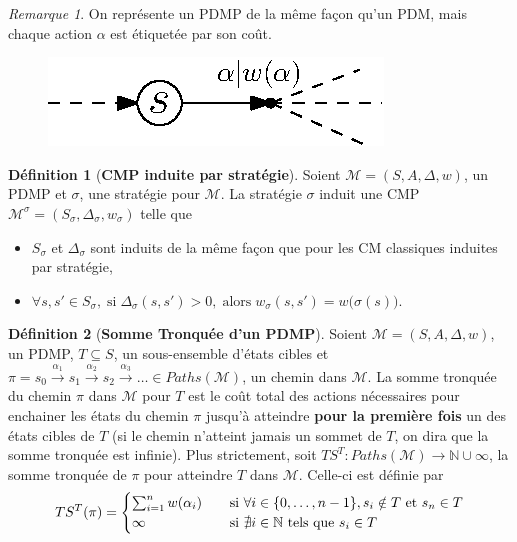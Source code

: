 \documentclass[12pt,a4paper]{report}
\theoremstyle{definition}%
\newtheorem{definition}{Définition}[chapter]
\theoremstyle{remark}
\newtheorem{remark}{Remarque}[chapter]
\let\labelitemi\labelitemii
\begin{document}
\begin{remark}
	On représente un PDMP de la même façon qu'un PDM, mais chaque action $\alpha$
	est étiquetée par son coût.
	\begin{figure}[H]
	\centering
		\includegraphics{figures/PDMP-example}
	\end{figure}
\end{remark}

\begin{definition}[\textbf{CMP induite par stratégie}]
	Soient $\mathcal{M} = (S, A, \Delta, w)$, un PDMP et $\sigma$, une
	stratégie pour $\mathcal{M}$. La stratégie $\sigma$ induit une CMP
	$\mathcal{M}^\sigma = (S_\sigma, \Delta_\sigma, w_\sigma)$ telle que
	\begin{itemize}
		\renewcommand{\labelitemi}{\tiny$\bullet$}
		\item $S_\sigma$ et $\Delta_\sigma$ sont induits de la même
			façon que pour les CM classiques induites par stratégie,
		\item
			$\forall s, s' \in S_{\sigma}, \; \text{si} \;
			\Delta_{\sigma}(s, s') > 0, \; \text{alors} \; w_{\sigma}(s, s') = w\big(\sigma(s)\big)$.
	\end{itemize}
\end{definition}


\begin{definition}[\textbf{Somme Tronquée d'un PDMP}]
	Soient $\mathcal{M} = (S, A, \Delta, w)$, un PDMP, $T \subseteq S$, un
	sous-ensemble d'états cibles et
	$\pi = s_0 \xrightarrow{\alpha_1} s_1 \xrightarrow{\alpha_2} s_2 \xrightarrow{\alpha_3} \dots \in Paths(\mathcal{M})$, un chemin dans
	$\mathcal{M}$. La somme tronquée du chemin $\pi$ dans $\mathcal{M}$ pour $T$
	est le coût total des actions nécessaires pour enchainer les états du chemin
	$\pi$ jusqu'à atteindre \textbf{pour la première fois} un des états cibles de
	$T$ (si le chemin n'atteint jamais un sommet de $T$, on dira que la somme
	tronquée est infinie). Plus strictement, soit $TS^T : Paths(\mathcal{M})
	\rightarrow \mathbb{N} \cup {\infty}$, la somme tronquée de $\pi$ pour atteindre $T$ dans
	$\mathcal{M}$. Celle-ci est définie par
	\[
		TS^T(\pi) =
		\begin{cases}
			\sum_{i = 1}^{n} w(\alpha_i) & \quad \text{si } \forall i \in \{0, \dots, n - 1\}, s_i \notin T \text{ et } s_n \in T \\
			\infty & \quad \text{si $ \nexists i \in \mathbb{N}$ tels que $s_i \in T$}
		\end{cases}
	\]
	\\
\end{definition}
\end{document}
